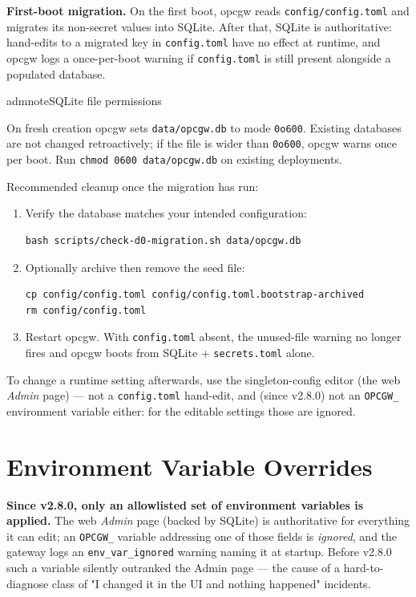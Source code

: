 \textbf{First-boot migration.} On the first boot, opcgw reads \texttt{config/config.toml} and migrates its non-secret values into SQLite. After that, SQLite is authoritative: hand-edits to a migrated key in \texttt{config.toml} have no effect at runtime, and opcgw logs a once-per-boot warning if \texttt{config.toml} is still present alongside a populated database.

\begin{admonition}{admnote}{SQLite file permissions}

On fresh creation opcgw sets \texttt{data/opcgw.db} to mode \texttt{0o600}. Existing databases are not changed retroactively; if the file is wider than \texttt{0o600}, opcgw warns once per boot. Run \texttt{chmod\ 0600\ data/opcgw.db} on existing deployments.

\end{admonition}

Recommended cleanup once the migration has run:

\begin{enumerate}
\item
  Verify the database matches your intended configuration:

\begin{lstlisting}
bash scripts/check-d0-migration.sh data/opcgw.db
\end{lstlisting}
\item
  Optionally archive then remove the seed file:

\begin{lstlisting}
cp config/config.toml config/config.toml.bootstrap-archived
rm config/config.toml
\end{lstlisting}
\item
  Restart opcgw. With \texttt{config.toml} absent, the unused-file warning no longer fires and opcgw boots from SQLite + \texttt{secrets.toml} alone.
\end{enumerate}

To change a runtime setting afterwards, use the singleton-config editor (the web \emph{Admin} page) --- not a \texttt{config.toml} hand-edit, and (since v2.8.0) not an \texttt{OPCGW\_} environment variable either: for the editable settings those are ignored.

\section{Environment Variable Overrides}\label{sec-config-env-overrides}

\textbf{Since v2.8.0, only an allowlisted set of environment variables is applied.} The web \emph{Admin} page (backed by SQLite) is authoritative for everything it can edit; an \texttt{OPCGW\_} variable addressing one of those fields is \emph{ignored}, and the gateway logs an \texttt{env\_var\_ignored} warning naming it at startup. Before v2.8.0 such a variable silently outranked the Admin page --- the cause of a hard-to-diagnose class of "I changed it in the UI and nothing happened" incidents.

